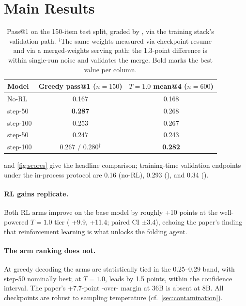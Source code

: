 \section{Main Results}
\label{sec:results}

\begin{table}[t]
\centering
\small
\begin{tabular}{lcc}
\toprule
Model & Greedy pass@1 ($n{=}150$) & $T{=}1.0$ mean@4 ($n{=}600$) \\
\midrule
No-RL \qwen{} & 0.167 & 0.168 \\
\grpo{} step-50 & \textbf{0.287} & 0.268 \\
\grpo{} step-100 & 0.253 & 0.267 \\
\foldgrpo{} step-50 & 0.247 & 0.243 \\
\foldgrpo{} step-100 & 0.267 / 0.280$^\dagger$ & \textbf{0.282} \\
\bottomrule
\end{tabular}
\caption{Pass@1 on the 150-item \bcplus{} test split, graded by \judgemodel{}, via the training
stack's validation path. $^\dagger$The same weights measured via checkpoint resume and via a
merged-weights serving path; the 1.3-point difference is within single-run noise and validates
the merge. Bold marks the best value per column.}
\label{tab:main}
\end{table}

 and \cref{fig:scores} give the headline comparison; training-time validation
endpoints under the in-process protocol are 0.16 (no-RL), 0.293 (\grpo{}), and 0.34
(\foldgrpo{}).

\paragraph{RL gains replicate.} Both RL arms improve on the base model by roughly +10 points at
the well-powered $T{=}1.0$ tier (\grpo{} +9.9, \foldgrpo{} +11.4; paired CI $\pm 3.4$), echoing
the paper's finding that reinforcement learning is what unlocks the folding agent.

\paragraph{The arm ranking does not.} At greedy decoding the arms are statistically tied in the
0.25--0.29 band, with \grpo{} step-50 nominally best; at $T{=}1.0$, \foldgrpo{} leads by 1.5
points, within the confidence interval. The paper's +7.7-point \foldgrpo{}-over-\grpo{} margin
at 36B is absent at 8B. All checkpoints are robust to sampling temperature
(cf.~\cref{sec:contamination}).

